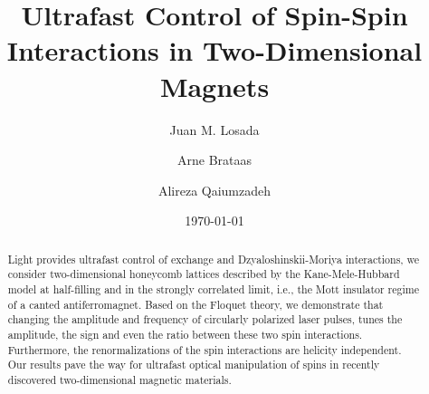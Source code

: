 \documentclass[aps,prl,twocolumn,amsmath,amssymb,nobibnotes]{revtex4-1}%
\begin{document}
\title{Ultrafast Control of Spin-Spin Interactions in Two-Dimensional Magnets}

\author{Juan M. Losada}
\author{Arne Brataas}
\author{Alireza Qaiumzadeh}

\begin{abstract}
Light provides ultrafast control of exchange and Dzyaloshinskii-Moriya interactions, we consider two-dimensional honeycomb lattices described by the Kane-Mele-Hubbard model at half-filling and in the strongly correlated limit, i.e., the Mott insulator regime of a canted antiferromagnet. Based on the Floquet theory, we demonstrate that changing the amplitude and frequency of circularly polarized laser pulses, tunes the amplitude, the sign and even the ratio between these two spin interactions. Furthermore, the renormalizations of the spin interactions are helicity independent. Our results pave the way for ultrafast optical manipulation of spins in recently discovered two-dimensional magnetic materials.
\end{abstract}

\date{\today}
\maketitle
\end{document}
